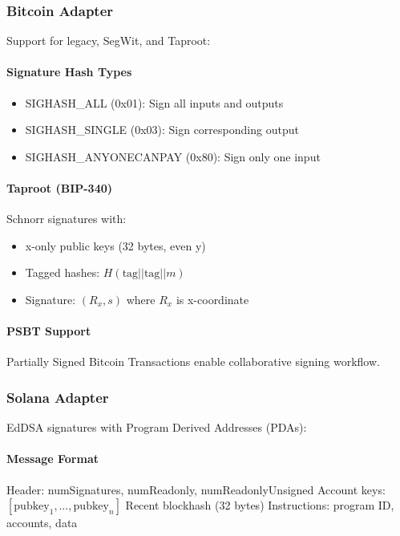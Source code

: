 \subsubsection{Bitcoin Adapter}

Support for legacy, SegWit, and Taproot:

\paragraph{Signature Hash Types}
\begin{itemize}
\item SIGHASH\_ALL (0x01): Sign all inputs and outputs
\item SIGHASH\_SINGLE (0x03): Sign corresponding output
\item SIGHASH\_ANYONECANPAY (0x80): Sign only one input
\end{itemize}

\paragraph{Taproot (BIP-340)} Schnorr signatures with:
\begin{itemize}
\item x-only public keys (32 bytes, even y)
\item Tagged hashes: $H(\text{tag} || \text{tag} || m)$
\item Signature: $(R_x, s)$ where $R_x$ is x-coordinate
\end{itemize}

\paragraph{PSBT Support} Partially Signed Bitcoin Transactions enable collaborative signing workflow.

\subsubsection{Solana Adapter}

EdDSA signatures with Program Derived Addresses (PDAs):

\paragraph{Message Format}
\begin{algorithmic}[1]
\State Header: numSignatures, numReadonly, numReadonlyUnsigned
\State Account keys: $[\text{pubkey}_1, \ldots, \text{pubkey}_n]$
\State Recent blockhash (32 bytes)
\State Instructions: program ID, accounts, data
\end{algorithmic}

